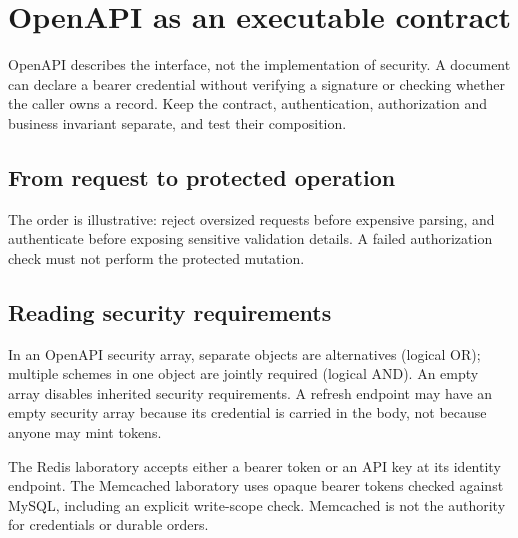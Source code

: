 \section{OpenAPI as an executable contract}
OpenAPI describes the interface, not the implementation of security. A document can declare a bearer credential without verifying a signature or checking whether the caller owns a record. Keep the contract, authentication, authorization and business invariant separate, and test their composition.

\subsection{From request to protected operation}
\begin{center}
\end{center}
The order is illustrative: reject oversized requests before expensive parsing, and authenticate before exposing sensitive validation details. A failed authorization check must not perform the protected mutation.

\subsection{Reading security requirements}
In an OpenAPI security array, separate objects are alternatives (logical OR); multiple schemes in one object are jointly required (logical AND). An empty array disables inherited security requirements. A refresh endpoint may have an empty security array because its credential is carried in the body, not because anyone may mint tokens.

The Redis laboratory accepts either a bearer token or an API key at its identity endpoint. The Memcached laboratory uses opaque bearer tokens checked against MySQL, including an explicit write-scope check. Memcached is not the authority for credentials or durable orders.

